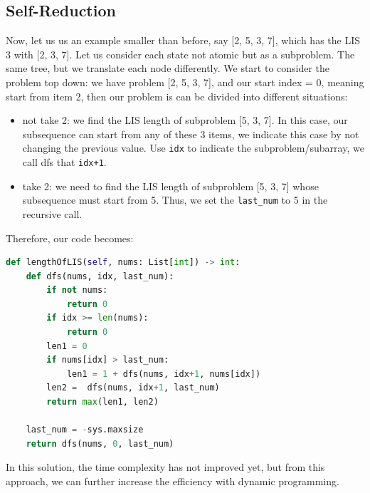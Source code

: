 \documentclass[../main.tex]{subfiles}
\begin{document}
\subsection{Self-Reduction}
 Now, let us us an example smaller than before, say [2, 5, 3, 7], which has the LIS 3 with [2, 3, 7]. Let us consider each state not atomic but as a subproblem. The same tree, but we translate each node differently. We start to consider the problem top down: we have problem [2, 5, 3, 7], and our start index = 0, meaning start from item 2, then our problem is can be divided into different situations:
\begin{itemize}
    \item not take 2: we find the LIS length of subproblem [5, 3, 7]. In this case, our subsequence can start from any of these 3 items, we indicate this case by not changing the previous value. Use \texttt{idx} to indicate the subproblem/subarray, we call dfs that \texttt{idx+1}. 
    \item take 2: we need to find  the LIS length of subproblem [5, 3, 7] whose subsequence must start from 5. Thus, we set the \texttt{last\_num} to 5 in the recursive call.  
\end{itemize}
Therefore, our code becomes: 
\begin{lstlisting}[language=Python]
def lengthOfLIS(self, nums: List[int]) -> int:
    def dfs(nums, idx, last_num):
        if not nums:
            return 0
        if idx >= len(nums):
            return 0
        len1 = 0
        if nums[idx] > last_num:
            len1 = 1 + dfs(nums, idx+1, nums[idx])
        len2 =  dfs(nums, idx+1, last_num)
        return max(len1, len2)
    
    last_num = -sys.maxsize
    return dfs(nums, 0, last_num)
\end{lstlisting}
In this solution, the time complexity has not improved yet, but from this approach, we can further increase the efficiency with dynamic programming. 

\end{document}
